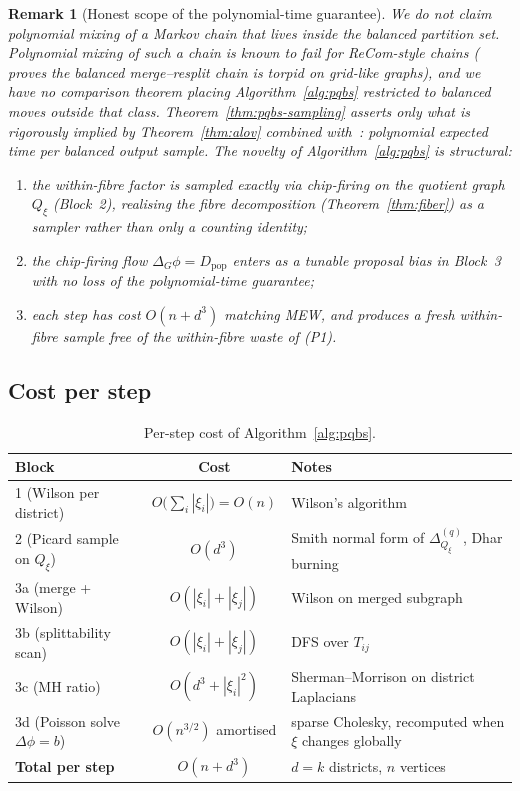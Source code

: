 \documentclass[11pt]{article}
\newtheorem{remark}{Remark}[section]
\begin{document}
\begin{remark}[Honest scope of the polynomial-time guarantee]
\label{rem:honest-scope}
We do \emph{not} claim polynomial mixing of a Markov chain that lives
inside the balanced partition set. Polynomial mixing of such a chain is
known to fail for ReCom-style chains
(\cite[Theorem 15]{charikar2023complexity} proves the
balanced merge--resplit chain is torpid on grid-like graphs), and we have
no comparison theorem placing Algorithm~\ref{alg:pqbs} restricted to
balanced moves outside that class. Theorem~\ref{thm:pqbs-sampling}
asserts only what is rigorously implied by Theorem~\ref{thm:alov}
combined with~\cite{cannon2024sampling}: polynomial \emph{expected time
per balanced output sample}. The novelty of
Algorithm~\ref{alg:pqbs} is structural:
\begin{enumerate}
  \item[(a)] the within-fibre factor is sampled exactly via chip-firing
    on the quotient graph $Q_\xi$ (Block~2), realising the fibre
    decomposition (Theorem~\ref{thm:fiber}) as a sampler rather than only
    a counting identity;
  \item[(b)] the chip-firing flow $\Delta_G \phi = D_{\mathrm{pop}}$
    enters as a tunable proposal bias in Block~3 with no loss of the
    polynomial-time guarantee;
  \item[(c)] each step has cost $O(n + d^3)$ matching MEW, and produces a
    fresh within-fibre sample free of the within-fibre waste of (P1).
\end{enumerate}
\end{remark}

\subsection{Cost per step}

\begin{table}[H]
\centering
\begin{tabular}{lcl}
\toprule
Block & Cost & Notes \\
\midrule
1 (Wilson per district) & $O\bigl(\sum_i |\xi_i|\bigr) = O(n)$ &
  Wilson's algorithm \cite{wilson1996generating} \\
2 (Picard sample on $Q_\xi$) & $O(d^3)$ &
  Smith normal form of $\Delta_{Q_\xi}^{(q)}$, Dhar burning \\
3a (merge + Wilson) & $O(|\xi_i| + |\xi_j|)$ &
  Wilson on merged subgraph \\
3b (splittability scan) & $O(|\xi_i| + |\xi_j|)$ &
  DFS over $T_{ij}$ \\
3c (MH ratio) & $O(d^3 + |\xi_i|^2)$ &
  Sherman--Morrison on district Laplacians \\
3d (Poisson solve $\Delta\phi=b$) & $O(n^{3/2})$ amortised &
  sparse Cholesky, recomputed when $\xi$ changes globally \\
\midrule
\textbf{Total per step} & $O(n + d^3)$ &
  $d = k$ districts, $n$ vertices \\
\bottomrule
\end{tabular}
\caption{Per-step cost of Algorithm~\ref{alg:pqbs}.}\label{tab:pqbs-cost}
\end{table}
\end{document}
